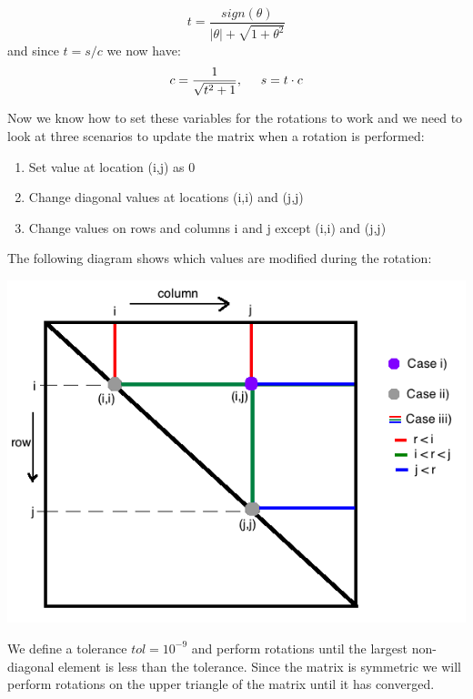 \documentclass[12pt,twoside]{article}
\begin{document}
\begin{equation}
t =  \frac{sign(\theta)}{|\theta|+ \sqrt{1+\theta^2}}
\end{equation}
and since $t=s/c$ we now have:\\
\begin{equation}
c =  \frac{1}{\sqrt{t^2+1}}, \hspace{5mm} s = t\cdot c
\end{equation}


Now we know how to set these variables for the rotations to work and we need to look at three scenarios to update the matrix when a rotation is performed:

\begin{enumerate}[label=\roman*)]
  \item Set value at location (i,j) as 0
  \item Change diagonal values at locations (i,i) and (j,j)
  \item Change values on rows and columns i and j except (i,i) and (j,j)
\end{enumerate}

The following diagram shows which values are modified during the rotation:
\begin{center}
\includegraphics[scale=0.5]{Matrix.png}
\end{center}

We define a tolerance $tol=10^{-9}$ and perform rotations until the largest non-diagonal element is less than the tolerance. Since the matrix is symmetric we will perform rotations on the upper triangle of the matrix until it has converged.\\
\end{document}
